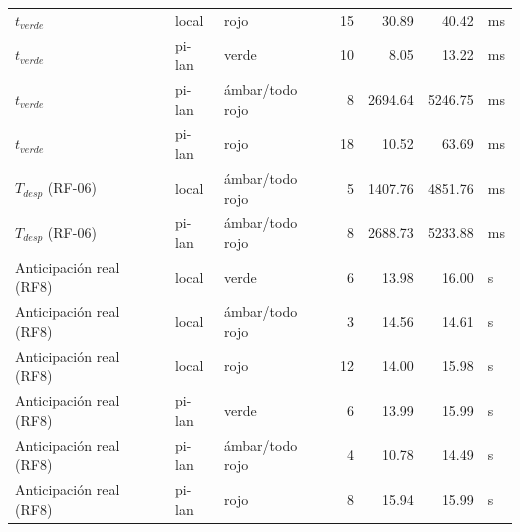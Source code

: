 \begin{table}[H]
\begin{tabular}{lllrrrl}
$t_{verde}$ & local & rojo & 15 & 30.89 & 40.42 & ms \\
$t_{verde}$ & pi-lan & verde & 10 & 8.05 & 13.22 & ms \\
$t_{verde}$ & pi-lan & ámbar/todo rojo & 8 & 2694.64 & 5246.75 & ms \\
$t_{verde}$ & pi-lan & rojo & 18 & 10.52 & 63.69 & ms \\
$T_{desp}$ (RF-06) & local & ámbar/todo rojo & 5 & 1407.76 & 4851.76 & ms \\
$T_{desp}$ (RF-06) & pi-lan & ámbar/todo rojo & 8 & 2688.73 & 5233.88 & ms \\
Anticipación real (RF8) & local & verde & 6 & 13.98 & 16.00 & s \\
Anticipación real (RF8) & local & ámbar/todo rojo & 3 & 14.56 & 14.61 & s \\
Anticipación real (RF8) & local & rojo & 12 & 14.00 & 15.98 & s \\
Anticipación real (RF8) & pi-lan & verde & 6 & 13.99 & 15.99 & s \\
Anticipación real (RF8) & pi-lan & ámbar/todo rojo & 4 & 10.78 & 14.49 & s \\
Anticipación real (RF8) & pi-lan & rojo & 8 & 15.94 & 15.99 & s \\
\bottomrule
\end{tabular}
\end{table}
